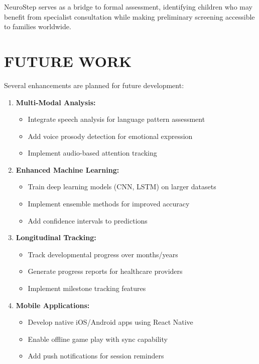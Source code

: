 \documentclass[12pt,letterpaper]{article}
\begin{document}
NeuroStep serves as a bridge to formal assessment, identifying children who may benefit from specialist consultation while making preliminary screening accessible to families worldwide.

\newpage


\section{FUTURE WORK}

Several enhancements are planned for future development:

\begin{enumerate}
    \item \textbf{Multi-Modal Analysis:}
    \begin{itemize}
        \item Integrate speech analysis for language pattern assessment
        \item Add voice prosody detection for emotional expression
        \item Implement audio-based attention tracking
    \end{itemize}
    
    \item \textbf{Enhanced Machine Learning:}
    \begin{itemize}
        \item Train deep learning models (CNN, LSTM) on larger datasets
        \item Implement ensemble methods for improved accuracy
        \item Add confidence intervals to predictions
    \end{itemize}
    
    \item \textbf{Longitudinal Tracking:}
    \begin{itemize}
        \item Track developmental progress over months/years
        \item Generate progress reports for healthcare providers
        \item Implement milestone tracking features
    \end{itemize}
    
    \item \textbf{Mobile Applications:}
    \begin{itemize}
        \item Develop native iOS/Android apps using React Native
        \item Enable offline game play with sync capability
        \item Add push notifications for session reminders
    \end{itemize}
    

\end{enumerate}
\end{document}
